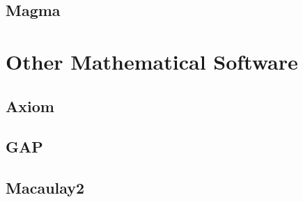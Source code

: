\documentclass{article}
\begin{document}
\subsection{Magma}\label{sec:magma}

\section{Other Mathematical Software}\label{sec:other}

\subsection{Axiom}

\subsection{GAP}

\subsection{Macaulay2}
\end{document}
